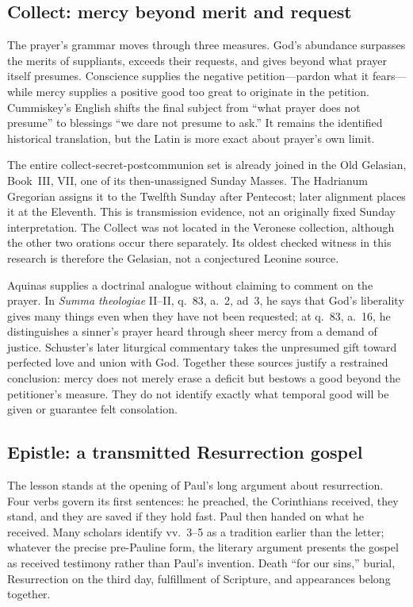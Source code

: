 \subsection*{Collect: mercy beyond merit and request\enspace{}}

The prayer's grammar moves through three measures. God's abundance surpasses
the merits of suppliants, exceeds their requests, and gives beyond what prayer
itself presumes. Conscience supplies the negative petition---pardon what it
fears---while mercy supplies a positive good too great to originate in the
petition. Cummiskey's English shifts the final subject from ``what prayer does
not presume'' to blessings ``we dare not presume to ask.'' It remains the
identified historical translation, but the Latin is more exact about prayer's
own limit.

The entire collect-secret-postcommunion set is already joined in the Old
Gelasian, Book~III, VII, one of its then-unassigned Sunday Masses. The
Hadrianum Gregorian assigns it to the Twelfth Sunday after Pentecost; later
alignment places it at the Eleventh. This is transmission evidence, not an
originally fixed Sunday interpretation. The Collect was not located in the
Veronese collection, although the other two orations occur there separately.
Its oldest checked witness in this research is therefore the Gelasian, not a
conjectured Leonine source.

Aquinas supplies a doctrinal analogue without claiming to comment on the
prayer. In \emph{Summa theologiae} II--II, q.~83, a.~2, ad~3, he says that
God's liberality gives many things even when they have not been requested;
at q.~83, a.~16, he distinguishes a sinner's prayer heard through sheer mercy
from a demand of justice. Schuster's later liturgical commentary takes the
unpresumed gift toward perfected love and union with God. Together these
sources justify a restrained conclusion: mercy does not merely erase a
deficit but bestows a good beyond the petitioner's measure. They do not
identify exactly what temporal good will be given or guarantee felt
consolation.

\subsection*{Epistle: a transmitted Resurrection gospel\enspace{}}

The lesson stands at the opening of Paul's long argument about resurrection.
Four verbs govern its first sentences: he preached, the Corinthians received,
they stand, and they are saved if they hold fast. Paul then handed on what he
received. Many scholars identify vv.~3--5 as a tradition earlier than the
letter; whatever the precise pre-Pauline form, the literary argument presents
the gospel as received testimony rather than Paul's invention. Death ``for
our sins,'' burial, Resurrection on the third day, fulfillment of Scripture,
and appearances belong together.

